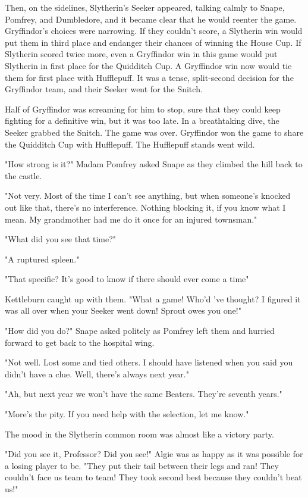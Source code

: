 Then, on the sidelines, Slytherin's Seeker appeared, talking calmly to Snape, Pomfrey, and Dumbledore, and it became clear that he would reenter the game. Gryffindor's choices were narrowing. If they couldn't score, a Slytherin win would put them in third place and endanger their chances of winning the House Cup. If Slytherin scored twice more, even a Gryffindor win in this game would put Slytherin in first place for the Quidditch Cup. A Gryffindor win now would tie them for first place with Hufflepuff. It was a tense, split-second decision for the Gryffindor team, and their Seeker went for the Snitch.

Half of Gryffindor was screaming for him to stop, sure that they could keep fighting for a definitive win, but it was too late. In a breathtaking dive, the Seeker grabbed the Snitch. The game was over. Gryffindor won the game to share the Quidditch Cup with Hufflepuff. The Hufflepuff stands went wild.

"How strong is it?" Madam Pomfrey asked Snape as they climbed the hill back to the castle.

"Not very. Most of the time I can't see anything, but when someone's knocked out like that, there's no interference. Nothing blocking it, if you know what I mean. My grandmother had me do it once for an injured townsman."

"What did you see that time?"

"A ruptured spleen."

"That specific? It's good to know if there should ever come a time{\el}"

Kettleburn caught up with them. "What a game! Who'd 've thought? I figured it was all over when your Seeker went down! Sprout owes you one!"

"How did you do?" Snape asked politely as Pomfrey left them and hurried forward to get back to the hospital wing.

"Not well. Lost some and tied others. I should have listened when you said you didn't have a clue. Well, there's always next year."

"Ah, but next year we won't have the same Beaters. They're seventh years."

"More's the pity. If you need help with the selection, let me know."

The mood in the Slytherin common room was almost like a victory party.

"Did you see it, Professor? Did you see!" Algie was as happy as it was possible for a losing player to be. "They put their tail between their legs and ran! They couldn't face us team to team! They took second best because they couldn't beat us!"

